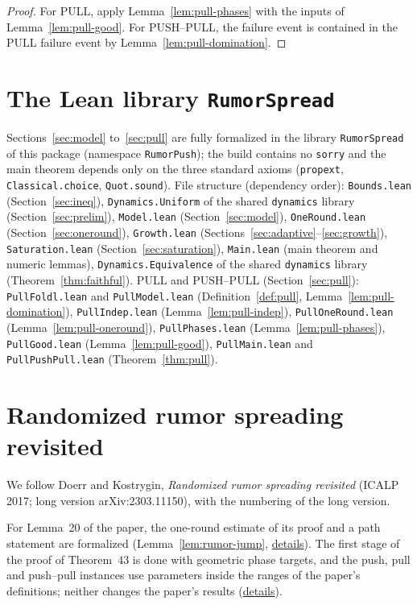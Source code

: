 \begin{proof}
  For PULL, apply Lemma~\ref{lem:pull-phases} with the inputs of
  Lemma~\ref{lem:pull-good}. For PUSH--PULL, the failure event is contained
  in the PULL failure event by Lemma~\ref{lem:pull-domination}.
\end{proof}

\section{The Lean library \texttt{RumorSpread}}\label{sec:lean}

Sections~\ref{sec:model} to~\ref{sec:pull} are fully formalized in the library
\texttt{RumorSpread} of this package (namespace \texttt{RumorPush}); the build
contains no \texttt{sorry} and the main theorem depends only on the three
standard axioms (\texttt{propext}, \texttt{Classical.choice},
\texttt{Quot.sound}). File structure (dependency order):
\texttt{Bounds.lean} (Section~\ref{sec:ineq}), \texttt{Dynamics.Uniform}
of the shared \texttt{dynamics} library (Section~\ref{sec:prelim}), \texttt{Model.lean}
(Section~\ref{sec:model}), \texttt{OneRound.lean}
(Section~\ref{sec:oneround}), \texttt{Growth.lean}
(Sections~\ref{sec:adaptive}--\ref{sec:growth}), \texttt{Saturation.lean}
(Section~\ref{sec:saturation}), \texttt{Main.lean} (main theorem and
numeric lemmas), \texttt{Dynamics.Equivalence} of the shared \texttt{dynamics} library
(Theorem~\ref{thm:faithful}).
PULL and PUSH--PULL (Section~\ref{sec:pull}): \texttt{PullFoldl.lean} and
\texttt{PullModel.lean} (Definition~\ref{def:pull},
Lemma~\ref{lem:pull-domination}), \texttt{PullIndep.lean}
(Lemma~\ref{lem:pull-indep}), \texttt{PullOneRound.lean}
(Lemma~\ref{lem:pull-oneround}), \texttt{PullPhases.lean}
(Lemma~\ref{lem:pull-phases}), \texttt{PullGood.lean}
(Lemma~\ref{lem:pull-good}), \texttt{PullMain.lean} and
\texttt{PullPushPull.lean} (Theorem~\ref{thm:pull}).

\section{Randomized rumor spreading revisited}\label{sec:doerr-kostrygin}
We follow Doerr and Kostrygin, \emph{Randomized rumor spreading revisited} (ICALP 2017; long
version arXiv:2303.11150), with the numbering of the long version.

For Lemma~20 of the paper, the one-round estimate of its proof and a path statement are
formalized (Lemma~\ref{lem:rumor-jump},
\href{https://github.com/formal-dynamics/leanamics/blob/main/epidemics/FORMALIZATION_DIFFERENCES.md#lemma-20-and-the-formalized-path-statement}{details}).
The first stage of the proof of Theorem~43 is done with geometric phase targets, and the push,
pull and push--pull instances use parameters inside the ranges of the paper's definitions;
neither changes the paper's results
(\href{https://github.com/formal-dynamics/leanamics/blob/main/epidemics/FORMALIZATION_DIFFERENCES.md#theorem-43-and-the-push-pull-and-pushpull-protocols}{details}).

